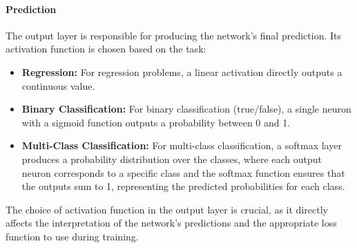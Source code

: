 



\paragraph{Prediction}
The output layer is responsible for producing the network's final prediction. Its activation function is chosen based on the task: 
\begin{itemize}
	\item \textbf{Regression:} For regression problems, a linear activation directly outputs a continuous value.
	\item \textbf{Binary Classification:} For binary classification (true/false), a single neuron with a sigmoid function outputs a probability between 0 and 1.
	\item \textbf{Multi-Class Classification:} For multi-class classification, a softmax layer produces a probability distribution over the classes, where each output neuron corresponds to a specific class and the softmax function ensures that the outputs sum to 1, representing the predicted probabilities for each class.
\end{itemize}
The choice of activation function in the output layer is crucial, as it directly affects the interpretation of the network's predictions and the appropriate loss function to use during training.




